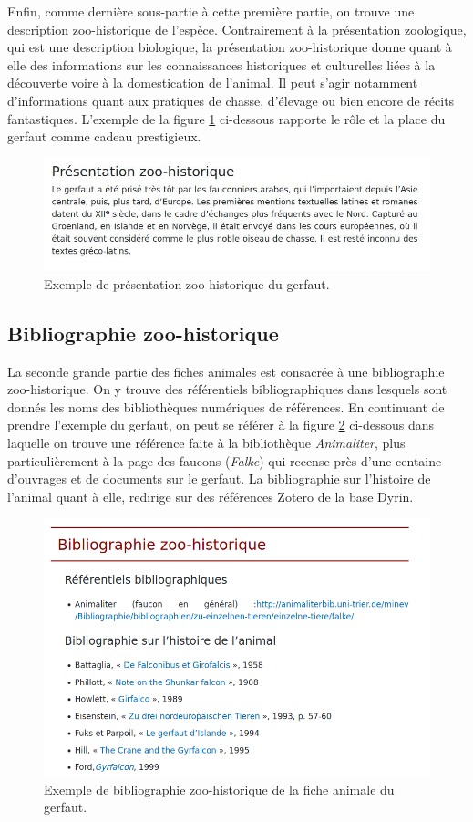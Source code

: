 \documentclass[a4paper,12pt,twoside]{book}
\begin{document}
Enfin, comme dernière sous-partie à cette première partie, on trouve une description zoo-historique de l'espèce. Contrairement à la présentation zoologique, qui est une description biologique, la présentation zoo-historique donne quant à elle des informations sur les connaissances historiques et culturelles liées à la découverte voire à la domestication de l'animal. Il peut s'agir notamment d'informations quant aux pratiques de chasse, d'élevage ou bien encore de récits fantastiques. L'exemple de la figure \ref{zoo_histo} ci-dessous rapporte le rôle et la place du gerfaut comme cadeau prestigieux.

\begin{figure}[H]
    \centering
    \includegraphics[width=13cm]{img/partie_3/pres_zoo_hist.JPG}
    \caption{Exemple de présentation zoo-historique du gerfaut.}
    \label{zoo_histo}
\end{figure}

\subsection{Bibliographie zoo-historique}
La seconde grande partie des fiches animales est consacrée à une bibliographie zoo-historique. On y trouve des référentiels bibliographiques dans lesquels sont donnés les noms des bibliothèques numériques de références. En continuant de prendre l'exemple du gerfaut, on peut se référer à la figure \ref{ref_biblio} ci-dessous dans laquelle on trouve une référence faite à la bibliothèque \textit{Animaliter}, plus particulièrement à la page des faucons (\textit{Falke}) qui recense près d'une centaine d'ouvrages et de documents sur le gerfaut. La bibliographie sur l'histoire de l'animal quant à elle, redirige sur des références Zotero de la base Dyrin.

\begin{figure}[H]
    \centering
    \includegraphics[width=12cm]{img/partie_3/biblio.png}
    \caption{Exemple de bibliographie zoo-historique de la fiche animale du gerfaut.}
    \label{ref_biblio}
\end{figure}
\end{document}
